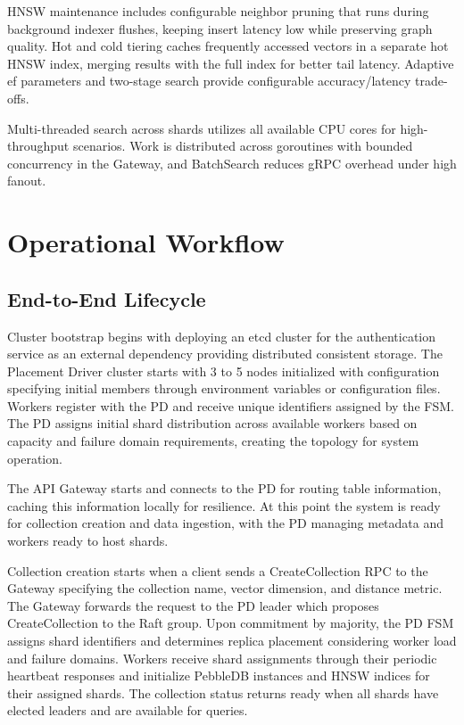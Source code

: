 \documentclass[conference]{IEEEtran}
\begin{document}
HNSW maintenance includes configurable neighbor pruning that runs during background indexer flushes, keeping insert latency low while preserving graph quality. Hot and cold tiering caches frequently accessed vectors in a separate hot HNSW index, merging results with the full index for better tail latency. Adaptive ef parameters and two-stage search provide configurable accuracy/latency trade-offs.

Multi-threaded search across shards utilizes all available CPU cores for high-throughput scenarios. Work is distributed across goroutines with bounded concurrency in the Gateway, and BatchSearch reduces gRPC overhead under high fanout.

\section{Operational Workflow}

\subsection{End-to-End Lifecycle}

Cluster bootstrap begins with deploying an etcd cluster for the authentication service as an external dependency providing distributed consistent storage. The Placement Driver cluster starts with 3 to 5 nodes initialized with configuration specifying initial members through environment variables or configuration files. Workers register with the PD and receive unique identifiers assigned by the FSM. The PD assigns initial shard distribution across available workers based on capacity and failure domain requirements, creating the topology for system operation.

The API Gateway starts and connects to the PD for routing table information, caching this information locally for resilience. At this point the system is ready for collection creation and data ingestion, with the PD managing metadata and workers ready to host shards.

Collection creation starts when a client sends a CreateCollection RPC to the Gateway specifying the collection name, vector dimension, and distance metric. The Gateway forwards the request to the PD leader which proposes CreateCollection to the Raft group. Upon commitment by majority, the PD FSM assigns shard identifiers and determines replica placement considering worker load and failure domains. Workers receive shard assignments through their periodic heartbeat responses and initialize PebbleDB instances and HNSW indices for their assigned shards. The collection status returns ready when all shards have elected leaders and are available for queries.
\end{document}
